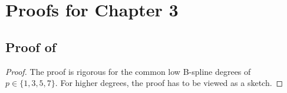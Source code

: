 \section{Proofs for Chapter 3}

\subsection{%
  Proof of \texorpdfstring{%
  }{%
    Proposition \ref{prop:hierBSplineLinearlyIndependent}%
  }%
}
\label{sec:proofHierBSplineLinearlyIndependent}

\propHierBSplineLinearlyIndependent*

\begin{proof}
  The proof is rigorous for the common low B-spline degrees of
  $p \in \{1, 3, 5, 7\}$.
  For higher degrees, the proof has to be viewed as a sketch.
  

\end{proof}
